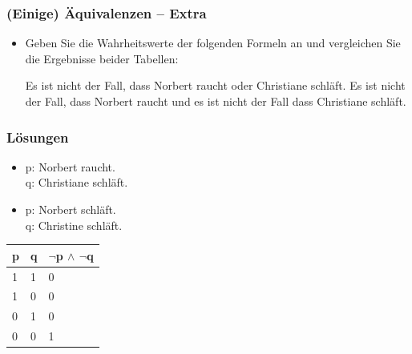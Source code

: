 \begin{frame}
\frametitle{(Einige) Äquivalenzen -- Extra}

\begin{itemize}
	\item Geben Sie die Wahrheitswerte der folgenden Formeln an und vergleichen Sie die Ergebnisse beider Tabellen:
	
	\ea Es ist nicht der Fall, dass Norbert raucht oder Christiane schläft.
	\ex Es ist nicht der Fall, dass Norbert raucht und es ist nicht der Fall dass Christiane schläft.
	\z 	
\end{itemize}

\end{frame}

\begin{frame}
\frametitle{Lösungen}

\begin{minipage}{0.48\textwidth}
\centering
\begin{itemize}
	\item[] p: Norbert raucht.\\
	q: Christiane schläft.
\end{itemize}
\end{minipage}
%
\begin{minipage}{0.48\textwidth}
\centering
\begin{itemize}
	\item[] p: Norbert schläft.\\
	q: Christine schläft.
\end{itemize}
\begin{tabular}{l|l|l}
	p & q & $ \lnot $p $ \land $ $ \lnot $q\\
	\hline
	1 & 1 & 0\\
	\hline
	1 & 0 & 0\\
	\hline
	0 & 1 & 0\\
	\hline
	0 & 0 & 1\\
\end{tabular}
\end{minipage}

\end{frame}

